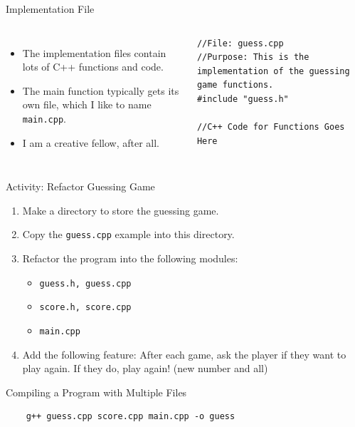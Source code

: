 \documentclass[]{beamer}
\begin{document}
\begin{frame}[fragile]{Implementation File}
\begin{columns}
\begin{itemize}[<+->]
    \item The implementation files contain lots of C++ functions and
        code.
    \item The main function typically gets its own file, which I like
        to name \texttt{main.cpp}.  
    \item I am a creative fellow, after all.
\end{itemize}

    \begin{adjustbox}{max width=\textwidth, max totalheight=0.9\textheight}
    \begin{BVerbatim}
//File: guess.cpp
//Purpose: This is the implementation of the guessing game functions.
#include "guess.h"

//C++ Code for Functions Goes Here
    \end{BVerbatim}
    \end{adjustbox}
\end{columns}
\end{frame}

\begin{frame}{Activity: Refactor Guessing Game}
    \begin{enumerate}
        \item Make a directory to store the guessing game.
        \item Copy the \texttt{guess.cpp} example into this directory.
        \item Refactor the program into the following modules:
        \begin{itemize}
            \item \texttt{guess.h, guess.cpp}
            \item \texttt{score.h, score.cpp}
            \item \texttt{main.cpp}
        \end{itemize}
        \item Add the following feature:
            \newline After each game, ask the player if they want to
                play again.  If they do, play again! (new number and all)
    \end{enumerate}
\end{frame}

\begin{frame}[fragile]{Compiling a Program with Multiple Files}
    \begin{BVerbatim}
    g++ guess.cpp score.cpp main.cpp -o guess
    \end{BVerbatim}
\end{frame}
\end{document}
